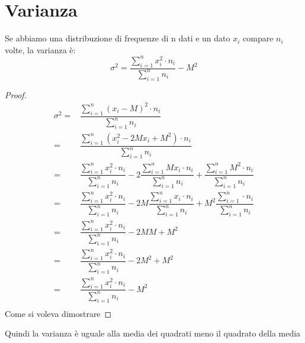 \chapter{Varianza}
\begin{thm}[Varianza]
	Se abbiamo una distribuzione di frequenze di n dati e un dato $x_{i}$ compare $n_{i}$ volte, la varianza è: \[\sigma^{2}=\dfrac{\sum_{i=1}^{n}x_{i}^{2}\cdot n_{i}}{\sum_{i=1}^{n} n_{i}}-M^2\] 
\end{thm}
\begin{proof}
\begin{align*}
\sigma^{2}=&\dfrac{\sum_{i=1}^{n}(x_{i}-M)^{2}\cdot n_{i}}{\sum_{i=1}^{n} n_{i}}\\
=&\dfrac{\sum_{i=1}^{n}(x_{i}^{2} -2Mx_{i}+M^{2})\cdot n_{i}}{\sum_{i=1}^{n} n_{i}}\\
=&\dfrac{\sum_{i=1}^{n}x_{i}^{2}\cdot n_{i}}{\sum_{i=1}^{n} n_{i}}-2 \dfrac{\sum_{i=1}^{n}Mx_{i}\cdot n_{i}}{\sum_{i=1}^{n} n_{i}} +\dfrac{\sum_{i=1}^{n}M^{2}\cdot n_{i}}{\sum_{i=1}^{n} n_{i}}\\
=&\dfrac{\sum_{i=1}^{n}x_{i}^{2}\cdot n_{i}}{\sum_{i=1}^{n} n_{i}}-2M \dfrac{\sum_{i=1}^{n}x_{i}\cdot n_{i}}{\sum_{i=1}^{n} n_{i}} +M^{2}\dfrac{\sum_{i=1}^{n}\cdot n_{i}}{\sum_{i=1}^{n} n_{i}}\\
=&\dfrac{\sum_{i=1}^{n}x_{i}^{2}\cdot n_{i}}{\sum_{i=1}^{n} n_{i}}-2MM +M^{2}\\
=&\dfrac{\sum_{i=1}^{n}x_{i}^{2}\cdot n_{i}}{\sum_{i=1}^{n} n_{i}}-2M^{2} +M^{2}\\
=&\dfrac{\sum_{i=1}^{n}x_{i}^{2}\cdot n_{i}}{\sum_{i=1}^{n} n_{i}}-M^{2}\\
\end{align*}
Come si voleva dimostrare
\end{proof}
Quindi la varianza è uguale alla media dei quadrati meno il quadrato della media